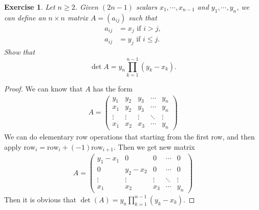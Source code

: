 \documentclass[11pt]{book}
\newtheorem{exercise}{Exercise}[section]
\theoremstyle{definition}
\numberwithin{equation}{subsection}
\begin{document}
\medskip

\begin{exercise}
Let $n\geq2$. Given $\left(  2n-1\right)  $ scalars $x_{1}%
,\cdots,x_{n-1}$ and $y_{1},\cdots,y_{n}$, we can define an $n\times n$ matrix
$A=\left(  a_{ij}\right)  $ such that%
\begin{align*}
a_{ij} &  =x_{j}\text{ if }i>j,\\
a_{ij} &  =y_{j}\text{ if }i\leq j.
\end{align*}
Show that%
$$
\det A=y_{n}%
{\displaystyle\prod\limits_{k=1}^{n-1}}
\left(  y_{k}-x_{k}\right).
$$
\end{exercise}
\begin{proof}
We can know that $A$ has the form 
\begin{align*}
    A = \begin{pmatrix}
    y_1 & y_2 & y_3 & \cdots & y_n \\
    x_1 & y_2 & y_3 & \cdots & y_n \\
    \vdots & \vdots & \vdots & \ddots & \vdots \\
    x_1 & x_2 & x_3 & \cdots & y_n
    \end{pmatrix}
\end{align*}
We can do elementary row operations that starting from the first row, and then apply $\text{row}_i=\text{row}_i+(-1)\text{row}_{i+1}$. Then we get new matrix
\begin{align*}
    A = \begin{pmatrix}
    y_1-x_1 & 0 & 0 & \cdots & 0 \\
    0 & y_2-x_2 & 0 & \cdots & 0 \\
    \vdots & \vdots & \vdots & \ddots & \vdots \\
    x_1 & x_2 & x_3 & \cdots & y_n
    \end{pmatrix}
\end{align*}
Then it is obvious that $\det(A)=y_n \prod_{k=1}^{n-1} (y_k-x_k)$.
\end{proof}

\medskip
\end{document}
